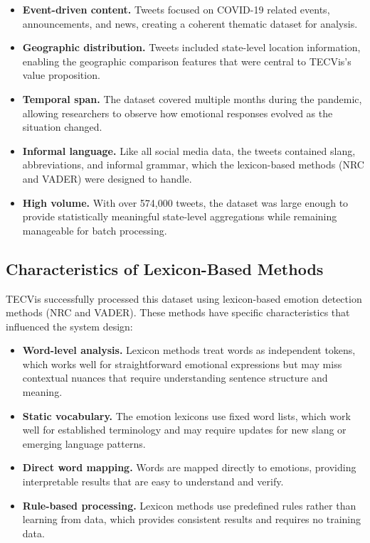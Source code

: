 \begin{itemize}
\item \textbf{Event-driven content.} Tweets focused on COVID-19 related events, announcements, and news, creating a coherent thematic dataset for analysis.

\item \textbf{Geographic distribution.} Tweets included state-level location information, enabling the geographic comparison features that were central to TECVis's value proposition.

\item \textbf{Temporal span.} The dataset covered multiple months during the pandemic, allowing researchers to observe how emotional responses evolved as the situation changed.

\item \textbf{Informal language.} Like all social media data, the tweets contained slang, abbreviations, and informal grammar, which the lexicon-based methods (NRC and VADER) were designed to handle.

\item \textbf{High volume.} With over 574,000 tweets, the dataset was large enough to provide statistically meaningful state-level aggregations while remaining manageable for batch processing.
\end{itemize}

\subsection{Characteristics of Lexicon-Based Methods}

TECVis successfully processed this dataset using lexicon-based emotion detection methods (NRC and VADER). These methods have specific characteristics that influenced the system design:

\begin{itemize}
\item \textbf{Word-level analysis.} Lexicon methods treat words as independent tokens, which works well for straightforward emotional expressions but may miss contextual nuances that require understanding sentence structure and meaning.

\item \textbf{Static vocabulary.} The emotion lexicons use fixed word lists, which work well for established terminology and may require updates for new slang or emerging language patterns.

\item \textbf{Direct word mapping.} Words are mapped directly to emotions, providing interpretable results that are easy to understand and verify.

\item \textbf{Rule-based processing.} Lexicon methods use predefined rules rather than learning from data, which provides consistent results and requires no training data.
\end{itemize}

